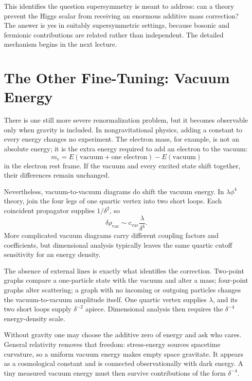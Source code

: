 This identifies the question supersymmetry is meant to address: can a theory
prevent the Higgs scalar from receiving an enormous additive mass correction?
The answer is yes in suitably supersymmetric settings, because bosonic and
fermionic contributions are related rather than independent. The detailed
mechanism begins in the next lecture.

\section{The Other Fine-Tuning: Vacuum Energy}

There is one still more severe renormalization problem, but it becomes
observable only when gravity is included. In
nongravitational physics, adding a constant to every energy changes no
experiment. The electron mass, for example, is not an absolute energy; it is
the extra energy required to add an electron to the vacuum:
\begin{equation}
m_e=E(\text{vacuum}+\text{one electron})-E(\text{vacuum})
\end{equation}
in the electron rest frame. If the vacuum and every excited state shift
together, their differences remain unchanged.

Nevertheless, vacuum-to-vacuum diagrams do shift the vacuum energy. In
\(\lambda\phi^4\) theory, join the four legs of one quartic vertex into two
short loops. Each coincident propagator supplies \(1/\delta^2\), so
\begin{equation}
\delta\rho_{\mathrm{vac}}
\sim
c_{\mathrm{vac}}\frac{\lambda}{\delta^4}.
\label{eq:vacuum-energy-divergence}
\end{equation}
More complicated vacuum diagrams carry different coupling factors and
coefficients, but dimensional analysis typically leaves the same quartic
cutoff sensitivity for an energy density.

The absence of external lines is exactly what identifies the correction.
Two-point graphs compare a one-particle state with the vacuum and alter a
mass; four-point graphs alter scattering; a graph with no incoming or
outgoing particles changes the vacuum-to-vacuum amplitude itself. One
quartic vertex supplies \(\lambda\), and its two short loops supply
\(\delta^{-2}\) apiece. Dimensional analysis then requires the
\(\delta^{-4}\) energy-density scale.

Without gravity one may choose the additive zero of energy and ask who cares.
General relativity removes that freedom: stress-energy sources spacetime
curvature, so a uniform vacuum energy makes empty space gravitate. It appears
as a cosmological constant and is connected observationally with dark energy.
A tiny measured vacuum energy must then survive contributions of the form
\(\delta^{-4}\).

